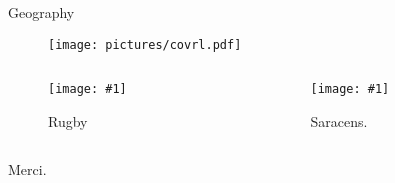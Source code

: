 \documentclass{beamer}
\newcommand{\insertfigure}[3] {

\begin{minipage}[b]{#2\linewidth}
    \texttt{[image: \#1]} 
    \caption{#3} 
\end{minipage} }
\newcommand{\insertf}[2]{\insertfigure{#1}{0.9}{#2}}
\begin{document}
\begin{frame}{Geography}
  \begin{figure}
  
  \begin{minipage}[b]{0.7\linewidth}
     \begin{center}
	 \texttt{[image: pictures/covrl.pdf]}
	 
  
    \end{center}

    
  \end{minipage} 
  \end{figure}
  \begin{minipage}{0.6\linewidth}
  
  \begin{columns}[c] %
\begin{column}{.6\textwidth}
\begin{figure}
  
 \insertf{pictures/rugby.pdf}{Rugby}
  

 
\end{figure}
\end{column}%
\begin{column}{.7\textwidth}

\begin{figure}
  
  \insertf{pictures/saracens.pdf}{Saracens.}
  \pause
 
\end{figure}

  \end{column}%
%

  \end{columns}

\end{minipage}

\end{frame} 

\begin{frame}{Merci.}
 
\end{frame}
\end{document}
